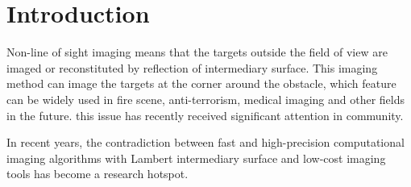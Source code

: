 \documentclass[sensors,article,accept,moreauthors,pdftex,10pt,a4paper]{mdpi}
\begin{document}
\section{Introduction}
\label{sect:Introduction}%
Non-line of sight imaging means that the targets outside the field of view are imaged or reconstituted by reflection of intermediary surface. This imaging method can image the targets at the corner around the obstacle, which feature can be widely used in fire scene, anti-terrorism, medical imaging and other fields in the future. this issue has recently received significant attention in community.

In recent years, the contradiction between fast and high-precision computational imaging algorithms with Lambert intermediary surface and low-cost imaging tools has become a research hotspot.
\end{document}
